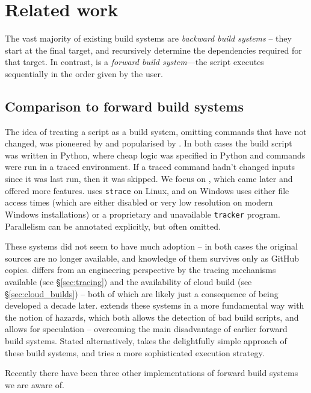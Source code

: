 \section{Related work}
\label{sec:related}

The vast majority of existing build systems are \emph{backward build systems} -- they start at the final target, and recursively determine the dependencies required for that target. In contrast, \Rattle is a \emph{forward build system}---the script executes sequentially in the order given by the user.

\subsection{Comparison to forward build systems}

The idea of treating a script as a build system, omitting commands that have not changed, was pioneered by \Memoize \cite{memoize} and popularised by \Fabricate \cite{fabricate}. In both cases the build script was written in Python, where cheap logic was specified in Python and commands were run in a traced environment. If a traced command hadn't changed inputs  since it was last run, then it was skipped. We focus on \Fabricate, which came later and offered more features. \Fabricate uses \texttt{strace} on Linux, and on Windows uses either file access times (which are either disabled or very low resolution on modern Windows installations) or a proprietary and unavailable \texttt{tracker} program. Parallelism can be annotated explicitly, but often omitted.

These systems did not seem to have much adoption -- in both cases the original sources are no longer available, and knowledge of them survives only as GitHub copies. \Rattle differs from an engineering perspective by the tracing mechanisms available (see \S\ref{sec:tracing}) and the availability of cloud build (see \S\ref{sec:cloud_builds}) -- both of which are likely just a consequence of being developed a decade later. \Rattle extends these systems in a more fundamental way with the notion of hazards, which both allows the detection of bad build scripts, and allows for speculation -- overcoming the main disadvantage of earlier forward build systems. Stated alternatively, \Rattle takes the delightfully simple approach of these build systems, and tries a more sophisticated execution strategy.

Recently there have been three other implementations of forward build systems we are aware of.


